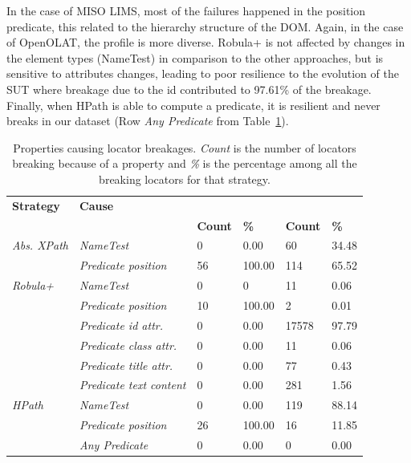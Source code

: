 In the case of MISO LIMS, most of the failures happened in the position predicate, this related to the hierarchy structure of the DOM. Again, in the case of OpenOLAT, the profile is more diverse. Robula+ is not affected by changes in the element types (NameTest) in comparison to the other approaches, but is sensitive to attributes changes, leading to poor resilience to the evolution of the SUT where breakage due to the id contributed to 97.61\% of the breakage. Finally, when HPath is able to compute a predicate, it is resilient and never breaks in our dataset (Row \emph{Any Predicate} from Table~\ref{tab:breakage_cause}).  

\begin{table}[!t]
\caption{Properties causing locator breakages. \emph{Count} is the number of locators breaking because of a property and \emph{\%} is the percentage among all the breaking locators for that strategy.}
\label{tab:breakage_cause}
\begin{center}
\begin{tabular}{>{\raggedright}m{0.4in}>{\raggedright}m{0.8in}>{\raggedleft}m{0.25in} >{\raggedleft}m{0.2in}>{\raggedleft}m{0.4in} >{\raggedleft}m{0.2in}}
\toprule
\textbf{\scriptsize{Strategy}} & \textbf{\scriptsize{Cause}} & \multicolumn{2}{c}{\textbf{\scriptsize{MISO LIMS}}} & \multicolumn{2}{c}{\textbf{\scriptsize{OpenOLAT}}}\tabularnewline
 &   & \textbf{\scriptsize{Count}} & \textbf{\scriptsize{\%}} & \textbf{\scriptsize{Count}} & \textbf{\scriptsize{\%}}\tabularnewline
\toprule
\scriptsize{\textit{Abs. XPath}} & \scriptsize{\textit{NameTest}} & \scriptsize{0} & \scriptsize{0.00} & \scriptsize{60} & \scriptsize{34.48}\tabularnewline
 & \scriptsize{\textit{Predicate position}} & \scriptsize{56} & \scriptsize{100.00} & \scriptsize{114} & \scriptsize{65.52}\tabularnewline
 \hline
\scriptsize{\textit{Robula+}} & \scriptsize{\textit{NameTest}} & \scriptsize{0} & \scriptsize{0} & \scriptsize{11} & \scriptsize{0.06}\tabularnewline
 & \scriptsize{\textit{Predicate position}} & \scriptsize{10} & \scriptsize{100.00} & \scriptsize{2} & \scriptsize{0.01}\tabularnewline
 & \scriptsize{\textit{Predicate id attr.}} & \scriptsize{0} & \scriptsize{0.00} & \scriptsize{17578} & \scriptsize{97.79}\tabularnewline
 & \scriptsize{\textit{Predicate class attr.}} & \scriptsize{0} & \scriptsize{0.00} & \scriptsize{11} & \scriptsize{0.06}\tabularnewline
 & \scriptsize{\textit{Predicate title attr.}} & \scriptsize{0} & \scriptsize{0.00} & \scriptsize{77} & \scriptsize{0.43}\tabularnewline
 & \scriptsize{\textit{Predicate text content}} & \scriptsize{0} & \scriptsize{0.00} & \scriptsize{281} & \scriptsize{1.56}\tabularnewline
 \hline
\scriptsize{\textit{HPath}} & \scriptsize{\textit{NameTest}} & \scriptsize{0} & \scriptsize{0.00} & \scriptsize{119} & \scriptsize{88.14}\tabularnewline
 & \scriptsize{\textit{Predicate position}} & \scriptsize{26} & \scriptsize{100.00} & \scriptsize{16} & \scriptsize{11.85}\tabularnewline
 & \scriptsize{\textit{Any Predicate}} & \scriptsize{0} & \scriptsize{0.00} & \scriptsize{0} & \scriptsize{0.00}\tabularnewline
\bottomrule
\end{tabular}
\end{center}
\vspace{-2em}
\end{table}

